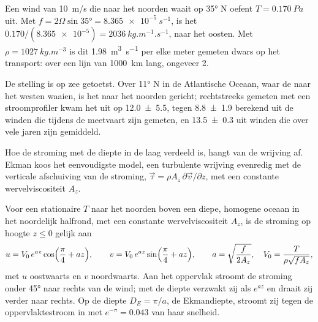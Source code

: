 \begin{example}\label{ex:b1:ocean-circulation:transport}
Een wind van \qty{10}{m/s} die naar het noorden waait op \ang{35} N oefent
$T = \qty{0.170}{Pa}$ uit. Met $f = 2\Omega\sin\ang{35} = \qty{8.365e-5}{s^{-1}}$, is het
 $0.170/(\num{8.365e-5}) = \qty{2036}{kg.m^{-1}.s^{-1}}$, naar het oosten. Met $\rho = \qty{1027}{kg.m^{-3}}$ is dit \qty{1.98}{m^3.s^{-1}} per
elke meter gemeten dwars op het transport: over een lijn van \qty{1000}{km} lang, ongeveer
\qty{2}{\sverdrup}.
\end{example}

De stelling is op zee getoetst. Over \ang{11} N in de Atlantische Oceaan, waar de  naar het westen waaien, is het  naar het noorden gericht; rechtstreeks gemeten met een stroomprofiler kwam het uit op
\qty[uncertainty-mode=separate]{12.0 \pm 5.5}{\sverdrup}, tegen
\qty[uncertainty-mode=separate]{8.8 \pm 1.9}{\sverdrup} berekend uit de winden die tijdens de meetvaart zijn gemeten, en
\qty[uncertainty-mode=separate]{13.5 \pm 0.3}{\sverdrup} uit winden die over vele jaren zijn gemiddeld.

Hoe de stroming met de diepte in de laag verdeeld is, hangt van de wrijving af. Ekman koos het eenvoudigste model, een turbulente wrijving evenredig met de verticale afschuiving van de stroming,
$\vec\tau = \rho A_z\,\partial\vec v/\partial z$, met
een constante wervelviscositeit $A_z$.

\begin{proposition}[De Ekmanspiraal]\label{prop:b1:ocean-circulation:spiral}
Voor een stationaire  $T$ naar het noorden boven een diepe, homogene oceaan in het
noordelijk halfrond, met een constante wervelviscositeit $A_z$, is de stroming op hoogte $z
\leq 0$ gelijk aan
\[
  u = V_0\,e^{az}\cos\Bigl(\frac\pi4 + az\Bigr),\qquad
  v = V_0\,e^{az}\sin\Bigl(\frac\pi4 + az\Bigr),\qquad
  a = \sqrt{\frac{f}{2A_z}},\quad V_0 = \frac{T}{\rho\sqrt{fA_z}},
\]
met $u$ oostwaarts en $v$ noordwaarts. Aan het oppervlak stroomt de stroming onder \ang{45} naar rechts van de wind; met de diepte verzwakt zij als $e^{az}$ en draait zij verder naar rechts. Op de diepte $D_E = \pi/a$, de Ekmandiepte, stroomt zij tegen de oppervlaktestroom in
met $e^{-\pi} = \num{0.043}$ van haar snelheid.
\end{proposition}
\admitted

